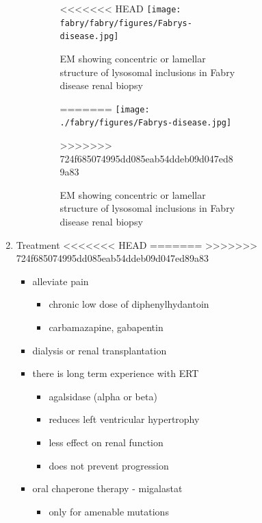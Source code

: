 \documentclass[fontsize=12pt]{scrartcl}
\begin{document}
\begin{enumerate}
\begin{enumerate}
\begin{enumerate}
\begin{enumerate}
\begin{table}[htbp]
\begin{enumerate}
\begin{enumerate}
\begin{enumerate}
\begin{figure}[htbp]
\centering
<<<<<<< HEAD
\texttt{[image: fabry/fabry/figures/Fabrys-disease.jpg]}
\caption[Fabry EM]{\label{fig:org0662962}EM showing concentric or lamellar structure of lysosomal inclusions in Fabry disease renal biopsy}
=======
\texttt{[image: ./fabry/figures/Fabrys-disease.jpg]}
\caption[Fabry EM]{\label{fig:orgaa51945}
EM showing concentric or lamellar structure of lysosomal inclusions in Fabry disease renal biopsy}
>>>>>>> 724f685074995dd085eab54ddeb09d047ed89a83
\end{figure}
\end{enumerate}

\item Treatment
<<<<<<< HEAD
\label{sec:org774dfc9}
=======
\label{sec:orga8ef2d6}
>>>>>>> 724f685074995dd085eab54ddeb09d047ed89a83
\begin{itemize}
\item alleviate pain
\begin{itemize}
\item chronic low dose of diphenylhydantoin
\item carbamazapine, gabapentin
\end{itemize}
\item dialysis or renal transplantation
\item there is long term experience with ERT
\begin{itemize}
\item agalsidase (alpha or beta)
\item reduces left ventricular hypertrophy
\item less effect on renal function
\item does not prevent progression
\end{itemize}
\item oral chaperone therapy - migalastat
\begin{itemize}
\item only for amenable mutations
\end{itemize}
\end{itemize}
\end{enumerate}

\end{enumerate}
\end{table}
\end{enumerate}
\end{enumerate}
\end{enumerate}
\end{enumerate}
\end{document}
